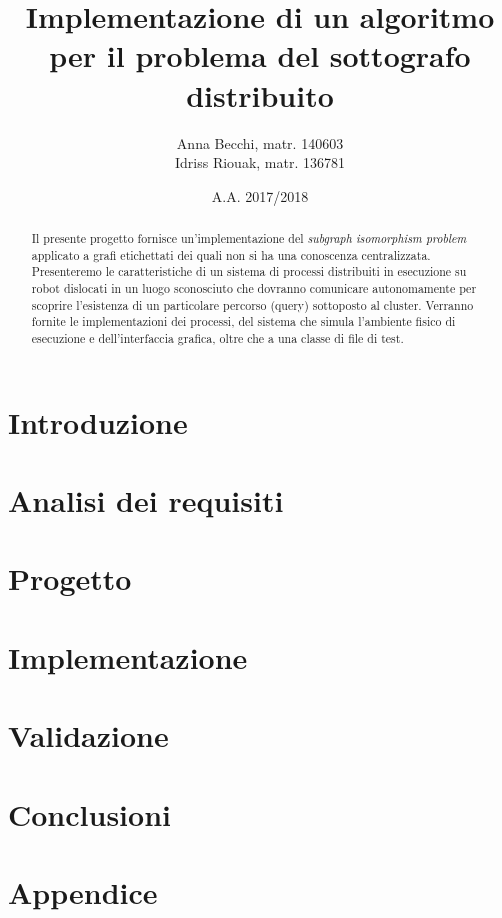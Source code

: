 \documentclass{checkpoint/llncs}
\title{Implementazione di un algoritmo\\
  per il problema del sottografo distribuito}
\author{Anna Becchi, matr. 140603\\
  Idriss Riouak, matr. 136781}
\institute{Laurea Magistrale in Informatica\\Universit\`a di Udine}
\date{A.A. 2017/2018}
\begin{document}
\maketitle
\begin{abstract}
  Il presente progetto fornisce un'implementazione del
  \emph{subgraph isomorphism problem} applicato a grafi
  etichettati dei quali non si ha una conoscenza centralizzata.
  Presenteremo le caratteristiche di un sistema di processi
  distribuiti in esecuzione su robot dislocati in un
  luogo sconosciuto che dovranno comunicare autonomamente
  per scoprire l'esistenza di un particolare percorso
  (query) sottoposto al cluster.
  Verranno fornite le implementazioni dei
  processi, del sistema che simula l'ambiente fisico
  di esecuzione e dell'interfaccia grafica, oltre che a una
  classe di file di test.
\end{abstract}

\section{Introduzione}
\label{ch:intro}


\newpage
\section{Analisi dei requisiti}
\label{ch:analysis}


\newpage
\section{Progetto}
\label{ch:project}


\newpage
\section{Implementazione}
\label{ch:impl}


\newpage
\section{Validazione}
\label{ch:validation}


\newpage
\section{Conclusioni}
\label{ch:conclusions}


\newpage
\appendix

\section{Appendice}
\label{ch:appendix}

\end{document}
